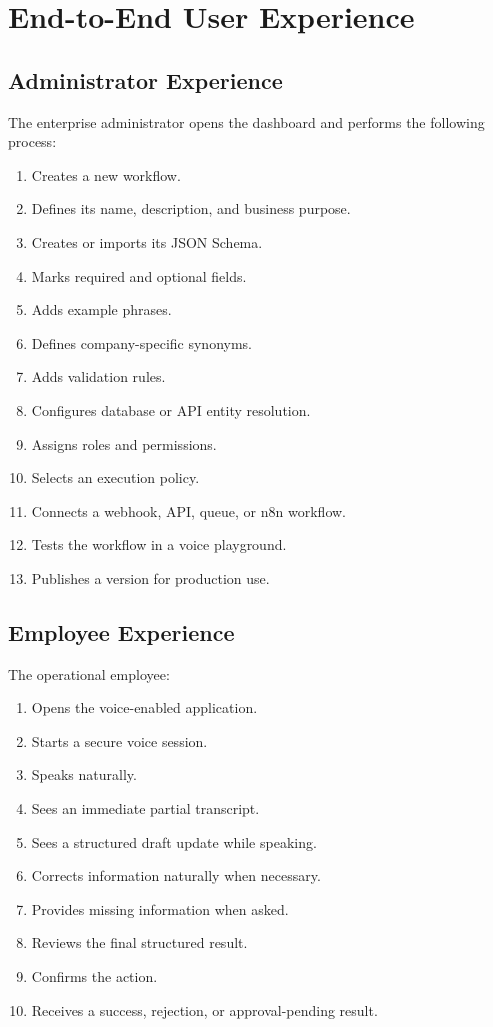 \documentclass[11pt,a4paper]{article}
\begin{document}
\section{End-to-End User Experience}

\subsection{Administrator Experience}

The enterprise administrator opens the dashboard and performs the
following process:

\begin{enumerate}
\item Creates a new workflow.
\item Defines its name, description, and business purpose.
\item Creates or imports its JSON Schema.
\item Marks required and optional fields.
\item Adds example phrases.
\item Defines company-specific synonyms.
\item Adds validation rules.
\item Configures database or API entity resolution.
\item Assigns roles and permissions.
\item Selects an execution policy.
\item Connects a webhook, API, queue, or n8n workflow.
\item Tests the workflow in a voice playground.
\item Publishes a version for production use.
\end{enumerate}

\subsection{Employee Experience}

The operational employee:

\begin{enumerate}
\item Opens the voice-enabled application.
\item Starts a secure voice session.
\item Speaks naturally.
\item Sees an immediate partial transcript.
\item Sees a structured draft update while speaking.
\item Corrects information naturally when necessary.
\item Provides missing information when asked.
\item Reviews the final structured result.
\item Confirms the action.
\item Receives a success, rejection, or approval-pending result.
\end{enumerate}
\end{document}
